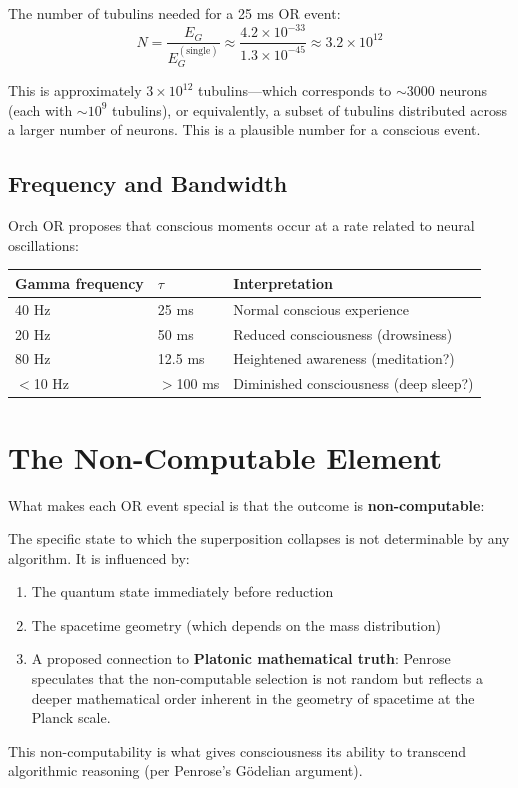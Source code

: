 \documentclass[11pt,a4paper]{report}
\begin{document}
The number of tubulins needed for a 25 ms OR event:
\[
  N = \frac{E_G}{E_G^{(\text{single})}} \approx \frac{4.2 \times 10^{-33}}{1.3 \times 10^{-45}} \approx 3.2 \times 10^{12}
\]

This is approximately $3 \times 10^{12}$ tubulins---which corresponds to $\sim$3000 neurons (each with $\sim 10^9$ tubulins), or equivalently, a subset of tubulins distributed across a larger number of neurons. This is a plausible number for a conscious event.

\subsection{Frequency and Bandwidth}

Orch OR proposes that conscious moments occur at a rate related to neural oscillations:

\begin{center}
\renewcommand{\arraystretch}{1.3}
\begin{tabular}{>{\raggedright}p{3.5cm} >{\raggedright}p{3cm} >{\raggedright\arraybackslash}p{6cm}}
  \toprule
  \textbf{Gamma frequency} & $\tau$ & \textbf{Interpretation} \\
  \midrule
  40 Hz & 25 ms & Normal conscious experience \\
  20 Hz & 50 ms & Reduced consciousness (drowsiness) \\
  80 Hz & 12.5 ms & Heightened awareness (meditation?) \\
  $<$10 Hz & $>$100 ms & Diminished consciousness (deep sleep?) \\
  \bottomrule
\end{tabular}
\end{center}

\section{The Non-Computable Element}

What makes each OR event special is that the outcome is \textbf{non-computable}:

\begin{principlebox}
The specific state to which the superposition collapses is not determinable by any algorithm. It is influenced by:
\begin{enumerate}[leftmargin=1.5em]
  \item The quantum state immediately before reduction
  \item The spacetime geometry (which depends on the mass distribution)
  \item A proposed connection to \textbf{Platonic mathematical truth}: Penrose speculates that the non-computable selection is not random but reflects a deeper mathematical order inherent in the geometry of spacetime at the Planck scale.
\end{enumerate}
This non-computability is what gives consciousness its ability to transcend algorithmic reasoning (per Penrose's G\"odelian argument).
\end{principlebox}
\end{document}

